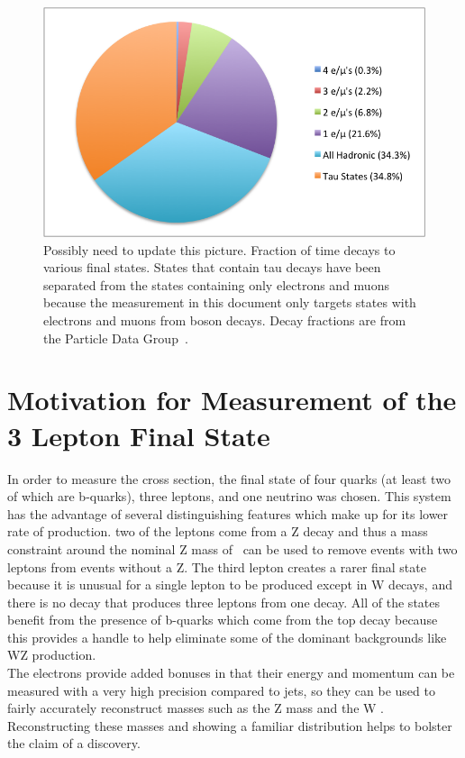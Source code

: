 	\begin{figure}[h]
\begin{center}
\includegraphics[width=0.8\linewidth]{Figs/ttZ_decay_fraction.png}
\caption{\label{fig:ttZ_decay_rates}
Possibly need to update this picture. Fraction of time \ttZ decays to various final states. States that contain tau decays have been separated from the states containing only electrons and muons because the measurement in this document only targets states with electrons and muons from boson decays. Decay fractions are from the Particle Data Group~\cite{pdg}.
}
\end{center}
\end{figure} 

	
	\section{Motivation for Measurement of the 3 Lepton Final State}
	In order to measure the \ttZ cross section, the final state of four quarks (at least two of which are b-quarks), three leptons, and one neutrino was chosen. This system has the advantage of several distinguishing features which make up for its lower rate of production. two of the leptons come from a Z decay and thus a mass constraint around the nominal Z mass of \zmass \ can be used to remove events with two leptons from events without a Z. The third lepton creates a rarer final state because it is unusual for a single lepton to be produced except in W decays, and there is no decay that produces three leptons from one decay. All of the states benefit from the presence of b-quarks which come from the top decay because this provides a handle to help eliminate some of the dominant backgrounds like WZ production.\\
	
	The electrons provide added bonuses in that their energy and momentum can be measured with a very high precision compared to jets, so they can be used to fairly accurately reconstruct masses such as the Z mass and the W \mt. Reconstructing these masses and showing a familiar distribution helps to bolster the claim of a \ttZ discovery. 